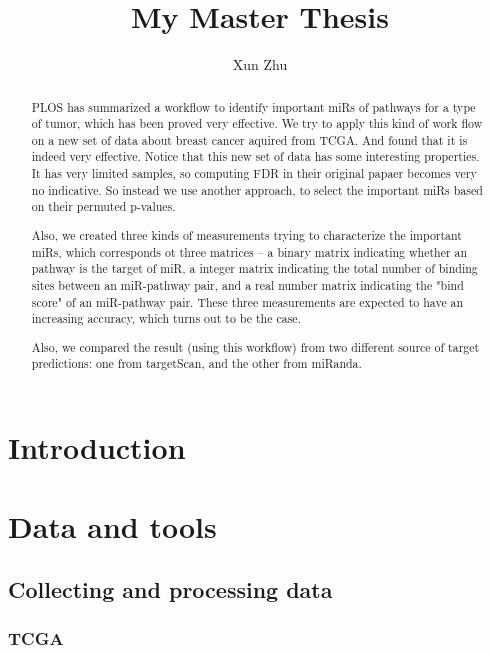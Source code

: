 \documentclass{scrartcl}
\title{My Master Thesis}
\author{Xun Zhu}
\begin{document}
\maketitle
\begin{abstract}
  PLOS has summarized a workflow\cite{???} to identify important miRs of
  pathways for a type of tumor, which has been proved very effective. We try to
  apply this kind of work flow on a new set of data about breast cancer aquired
  from TCGA. And found that it is indeed very effective. Notice that this new
  set of data has some interesting properties. It has very limited samples, so
  computing FDR in their original papaer becomes very no indicative. So instead
  we use another approach, to select the important miRs based on their permuted
  p-values.

  Also, we created three kinds of measurements trying to characterize the
  important miRs, which corresponds ot three matrices -- a binary matrix
  indicating whether an pathway is the target of miR, a integer matrix
  indicating the total number of binding sites between an miR-pathway pair, and
  a real number matrix indicating the "bind score" of an miR-pathway pair.
  These three measurements are expected to have an increasing accuracy, which
  turns out to be the case.

  Also, we compared the result (using this workflow) from two different source
  of target predictions: one from targetScan\cite{???}, and the other from
  miRanda\cite{???}.

\end{abstract}

\section{Introduction}


\section{Data and tools}

\subsection{Collecting and processing data}

\subsubsection{TCGA}
\end{document}

